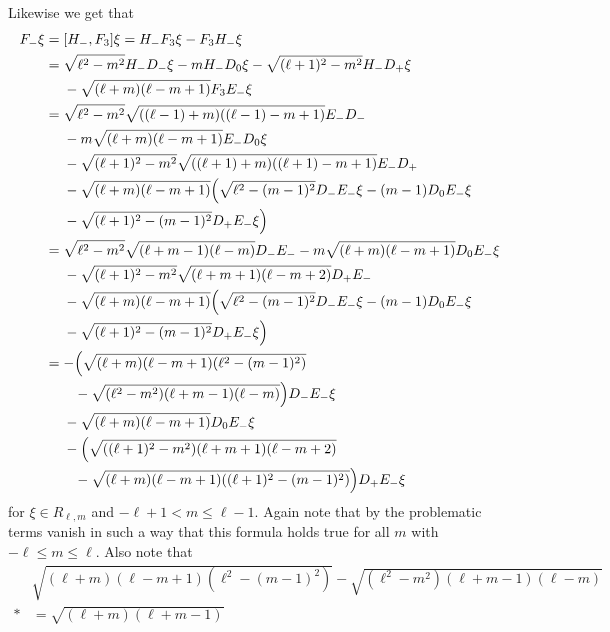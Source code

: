 Likewise we get that
\begin{align*}
  F_- \xi &= [H_-,F_3] \xi = H_-F_3 \xi - F_3H_- \xi \\
          &= \sqrt{\ell^2-m^2} H_-D_- \xi - m H_-D_0 \xi - \sqrt{(\ell+1)^2-m^2} H_-D_+ \xi \\*
          &\phantom{{}={}}{} - \sqrt{(\ell+m)(\ell-m+1)} F_3 E_-\xi \\
          &= \sqrt{\ell^2-m^2} \sqrt{((\ell-1)+m)((\ell-1)-m+1)} E_-D_- \\*
          &\phantom{{}={}}{} - m\sqrt{(\ell+m)(\ell-m+1)} E_-D_0\xi \\*
          &\phantom{{}={}}{} - \sqrt{(\ell+1)^2-m^2}\sqrt{((\ell+1)+m)((\ell+1)-m+1)} E_-D_+ \\*
          &\phantom{{}={}}{} - \sqrt{(\ell+m)(\ell-m+1)} \Bigl( \sqrt{\ell^2-(m-1)^2}D_-E_-\xi - (m-1)D_0E_-\xi \\*
          &\phantom{{}={}}{} - \sqrt{(\ell+1)^2-(m-1)^2} D_+E_-\xi \Bigr) \\
          &= \sqrt{\ell^2-m^2} \sqrt{(\ell+m-1)(\ell-m)} D_-E_- - m\sqrt{(\ell+m)(\ell-m+1)} D_0E_-\xi \\*
          &\phantom{{}={}}{} - \sqrt{(\ell+1)^2-m^2}\sqrt{(\ell+m+1)(\ell-m+2)} D_+E_- \\*
          &\phantom{{}={}}{} - \sqrt{(\ell+m)(\ell-m+1)} \Bigl( \sqrt{\ell^2-(m-1)^2}D_-E_-\xi - (m-1)D_0E_-\xi \\*
          &\phantom{{}={}}{} - \sqrt{(\ell+1)^2-(m-1)^2} D_+E_-\xi \Bigr) \\
          &= -\Bigl( \sqrt{(\ell+m)(\ell-m+1)(\ell^2-(m-1)^2)} \\*
          &\phantom{{}={}()}{} - \sqrt{(\ell^2-m^2)(\ell+m-1)(\ell-m)}  \Bigr)D_-E_-\xi \\*
          &\phantom{{}={}}{} - \sqrt{(\ell+m)(\ell-m+1)} D_0E_-\xi \\*
          &\phantom{{}={}}{} - \Bigl( \sqrt{((\ell+1)^2-m^2)(\ell+m+1)(\ell-m+2)} \\*
          &\phantom{{}={}()}{} - \sqrt{(\ell+m)(\ell-m+1)((\ell+1)^2-(m-1)^2)}\Bigr)D_+E_-\xi
\end{align*}
for $\xi\in R_{\ell,m}$ and $-\ell+1 < m\leq \ell-1$. Again note that by the problematic terms vanish in such a way that this formula holds true for all $m$ with $-\ell\leq m\leq \ell$. Also note that
\begin{align*}
  &\sqrt{(\ell+m)(\ell-m+1)(\ell^2-(m-1)^2)} - \sqrt{(\ell^2-m^2)(\ell+m-1)(\ell-m)} \\*
  &= \sqrt{(\ell+m)(\ell+m-1)}
\end{align*}

